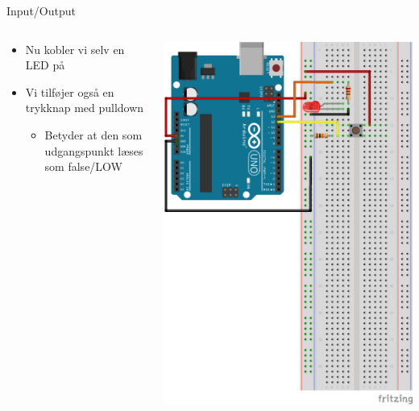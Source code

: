 \documentclass{beamer}
\begin{document}
\begin{frame}[fragile]{Input/Output}
\begin{columns}
	\begin{column}{0.5\textwidth}
	\begin{itemize}
		\item{Nu kobler vi selv en LED på}
		\item{Vi tilføjer også en trykknap med pulldown}
		\begin{itemize}
			\item{Betyder at den som udgangspunkt læses som false/LOW}
		\end{itemize}
	\end{itemize}
	\end{column}
	\begin{column}{0.5\textwidth}
	\begin{center}
		\includegraphics[width=1\textwidth]{../Examples/2_IO/2_IO_bb.png}
	\end{center}
	\end{column}
\end{columns}
\end{frame}
\end{document}
